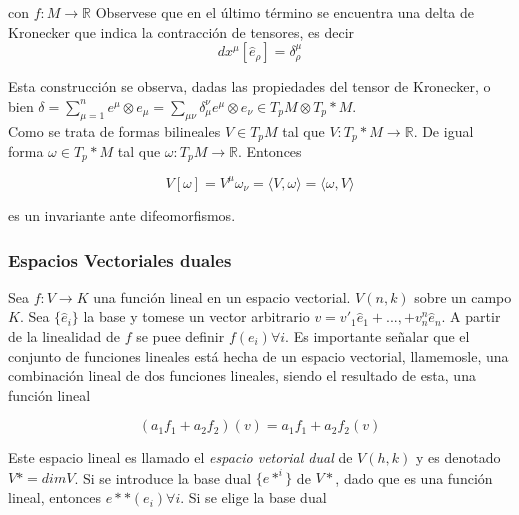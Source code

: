 \documentclass{report}
\begin{document}
con $f: M \rightarrow \mathbb{R}$ Observese que en el último término se encuentra una delta de Kronecker que indica la contracción de tensores, es decir\\

\begin{equation}
dx^{\mu}[\hat e_{\rho}] = \delta _{\rho} ^{\mu}
\end{equation}

Esta construcción se observa, dadas las propiedades del tensor de Kronecker, o bien $\delta  = \sum _{\mu = 1} ^{n} e^{\mu} \otimes e_{\mu} = \sum _{\mu \nu} \delta _{\mu}^{\nu} e^{\mu} \otimes e_{\nu} \in T_{p}M \otimes T_{p}*M$.\\


Como se trata de formas bilineales $V \in T_{p}M$ tal que $V:T_{p}*M    \rightarrow \mathbb{R}$. De igual forma $\omega \in T_{p}*M$ tal que $\omega : T_{p}M \rightarrow \mathbb{R}$. Entonces

\begin{equation}
V[\omega] = V^{\mu} \omega_{\nu} = \langle V, \omega \rangle = \langle \omega, V \rangle
\end{equation}

es un invariante ante difeomorfismos.\\

\subsubsection{Espacios Vectoriales duales}

Sea $f: V \rightarrow K$ una función lineal en un espacio vectorial. $V(n,k)$ sobre un campo $K$. Sea $\lbrace \widehat{e}_{i} \rbrace$ la base y tomese un vector arbitrario $v = v' _{1} \widehat{e}_{1}+...,+v^{n} _{n} \widehat{e}_{n}$. A partir de la linealidad de $f$ se puee definir $f(e_{i}) \forall i$. Es importante señalar que el conjunto de funciones lineales está hecha de un espacio vectorial, llamemosle, una combinación lineal de dos funciones lineales, siendo el resultado de esta, una función lineal

\begin{equation}
(a_{1}f_{1}+a_{2}f_{2})(v) = a_{1}f_{1}+a_{2}f_{2}(v)
\end{equation}

Este espacio lineal es llamado el \textit{espacio vetorial dual} de $V(h,k)$ y es denotado $V* = dim V$. Si se introduce la base dual $\lbrace e*^{i} \rbrace$ de $V*$, dado que es una función lineal, entonces $e**(e_{i}) \forall i$. Si se elige la base dual
\end{document}
